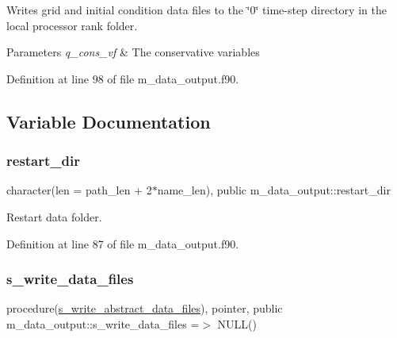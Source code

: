 Writes grid and initial condition data files to the \char`\"{}0\char`\"{} time-\/step directory in the local processor rank folder. 


\begin{DoxyParams}{Parameters}
{\em q\+\_\+cons\+\_\+vf} & The conservative variables \\
\hline
\end{DoxyParams}


Definition at line 98 of file m\+\_\+data\+\_\+output.\+f90.



\subsection{Variable Documentation}
\mbox{\label{namespacem__data__output_aa2b7bc17089e38b53927e6b77b61b6c7}} 
\subsubsection{\texorpdfstring{restart\+\_\+dir}{restart\_dir}}
{\footnotesize\ttfamily character(len = path\+\_\+len + 2$\ast$name\+\_\+len), public m\+\_\+data\+\_\+output\+::restart\+\_\+dir}



Restart data folder. 



Definition at line 87 of file m\+\_\+data\+\_\+output.\+f90.

\mbox{\label{namespacem__data__output_a1ba4e8126b198fb2147d4d9b60f74e44}} 
\subsubsection{\texorpdfstring{s\+\_\+write\+\_\+data\+\_\+files}{s\_write\_data\_files}}
{\footnotesize\ttfamily procedure(\hyperlink{interfacem__data__output_1_1s__write__abstract__data__files}{s\+\_\+write\+\_\+abstract\+\_\+data\+\_\+files}), pointer, public m\+\_\+data\+\_\+output\+::s\+\_\+write\+\_\+data\+\_\+files =$>$ N\+U\+LL()}



